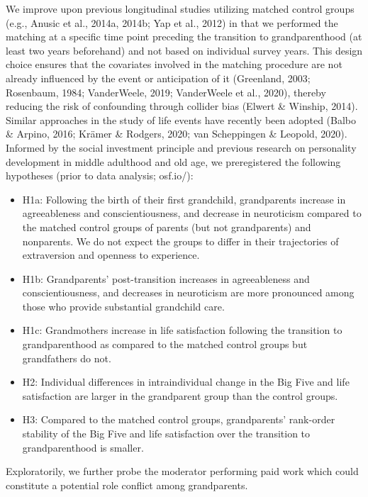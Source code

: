 \documentclass[
  english,
  man, noextraspace]{apa7}
\providecommand{\tightlist}{%
  \setlength{\itemsep}{0pt}\setlength{\parskip}{0pt}}
\begin{document}
We improve upon previous longitudinal studies utilizing matched control groups (e.g., Anusic et al., 2014a, 2014b; Yap et al., 2012) in that we performed the matching at a specific time point preceding the transition to grandparenthood (at least two years beforehand) and not based on individual survey years. This design choice ensures that the covariates involved in the matching procedure are not already influenced by the event or anticipation of it (Greenland, 2003; Rosenbaum, 1984; VanderWeele, 2019; VanderWeele et al., 2020), thereby reducing the risk of confounding through collider bias (Elwert \& Winship, 2014). Similar approaches in the study of life events have recently been adopted (Balbo \& Arpino, 2016; Krämer \& Rodgers, 2020; van Scheppingen \& Leopold, 2020).\\
Informed by the social investment principle and previous research on personality development in middle adulthood and old age, we preregistered the following hypotheses (prior to data analysis; osf.io/):

\begin{itemize}
\tightlist
\item
  H1a: Following the birth of their first grandchild, grandparents increase in agreeableness and conscientiousness, and decrease in neuroticism compared to the matched control groups of parents (but not grandparents) and nonparents. We do not expect the groups to differ in their trajectories of extraversion and openness to experience.
\item
  H1b: Grandparents' post-transition increases in agreeableness and conscientiousness, and decreases in neuroticism are more pronounced among those who provide substantial grandchild care.
\item
  H1c: Grandmothers increase in life satisfaction following the transition to grandparenthood as compared to the matched control groups but grandfathers do not.
\item
  H2: Individual differences in intraindividual change in the Big Five and life satisfaction are larger in the grandparent group than the control groups.
\item
  H3: Compared to the matched control groups, grandparents' rank-order stability of the Big Five and life satisfaction over the transition to grandparenthood is smaller.
\end{itemize}

Exploratorily, we further probe the moderator performing paid work which could constitute a potential role conflict among grandparents.
\end{document}
